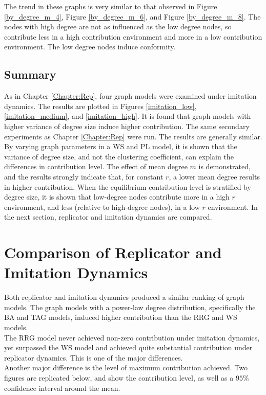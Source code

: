 The trend in these graphs is very similar to that observed in Figure \ref{by_degree_m_4}, Figure \ref{by_degree_m_6}, and Figure \ref{by_degree_m_8}. The nodes with high degree are not as influenced as the low degree nodes, so contribute less in a high contribution environment and more in a low contribution environment. The low degree nodes induce conformity.

\subsection{Summary}
As in Chapter \ref{Chapter:Rep}, four graph models were examined under imitation dynamics. The results are plotted in Figures \ref{imitation_low}, \ref{imitation_medium}, and \ref{imitation_high}. It is found that graph models with higher variance of degree size induce higher contribution. The same secondary experiments as Chapter \ref{Chapter:Rep} were run. The results are generally similar. By varying graph parameters in a WS and PL model, it is shown that the variance of degree size, and not the clustering coefficient, can explain the differences in contribution level. The effect of mean degree $m$ is demonstrated, and the results strongly indicate that, for constant $r$, a lower mean degree results in higher contribution. When the equilibrium contribution level is stratified by degree size, it is shown that low-degree nodes contribute more in a high $r$ environment, and less (relative to high-degree nodes), in a low $r$ environment. In the next section, replicator and imitation dynamics are compared. 

\section{Comparison of Replicator and Imitation Dynamics}

Both replicator and imitation dynamics produced a similar ranking of graph models. The graph models with a power-law degree distribution, specifically the BA and TAG models, induced higher contribution than the RRG and WS models. \\

The RRG model never achieved non-zero contribution under imitation dynamics, yet surpassed the WS model and achieved quite substantial contribution under replicator dynamics. This is one of the major differences. \\

Another major difference is the level of maximum contribution achieved. Two figures are replicated below, and show the contribution level, as well as a $95\%$ confidence interval around the mean. \\

